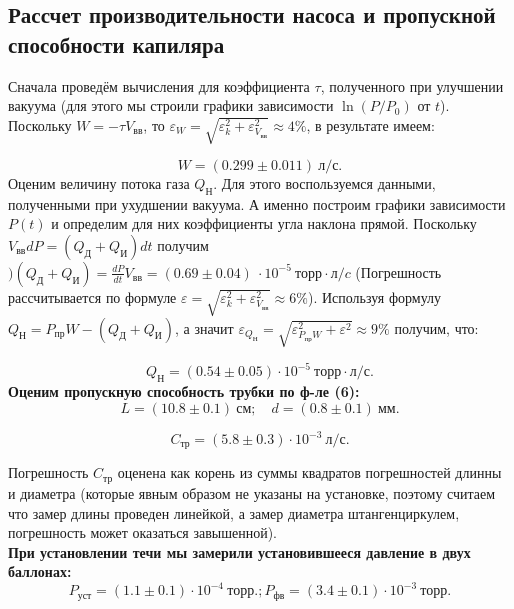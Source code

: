 \documentclass[a4paper, 12pt]{article}%
\begin{document}
\subsection{Рассчет производительности насоса и пропускной способности капиляра}
Сначала проведём вычисления для коэффициента $\tau$, полученного при улучшении вакуума (для этого мы строили графики зависимости $\ln (P/P_0)$ от $t$). Поскольку $W = -\tau V_{вв}$, то $\varepsilon_W = \sqrt{\varepsilon_k^2 + \varepsilon_{V_{вв}}^2} \approx 4\%$, в результате имеем: 

\begin{equation*}
W = (0.299 \pm 0.011) ~ л /	 с.
\end{equation*}
Оценим величину потока газа  $Q_Н$. Для этого воспользуемся данными, полученными при ухудшении вакуума. А именно построим графики зависимости $P(t)$ и определим для них коэффициенты угла наклона прямой. Поскольку $V_{вв}dP = (Q_Д + Q_И) dt$ получим $)(Q_Д + Q_И) = \frac{dP}{dt}V_{вв} = (0.69 \pm 0.04)~ \cdot 10^{-5} ~торр \cdot л / c $ (Погрешность рассчитывается по формуле $\varepsilon =  \sqrt{\varepsilon_k^2 + \varepsilon_{V_{вв}}^2} \approx 6\%$). Используя формулу $Q_Н = P_{пр}W - (Q_Д + Q_И)$, а значит $\varepsilon_{Q_Н} =  \sqrt{\varepsilon_{P_{пр}W}^2 + \varepsilon^2} \approx 9\%$ получим, что: 

\begin{equation*}
	Q_Н = (0.54 \pm 0.05) \cdot 10^{-5} ~ торр \cdot л / с.
\end{equation*}
\textbf{Оценим пропускную способность трубки по ф-ле (6):}
\begin{equation*}
	L = (10.8 \pm 0.1)~ см; \quad   d = (0.8 \pm 0.1) ~ мм.
\end{equation*}

\begin{equation*}
	C_{тр} = (5.8 \pm 0.3)\cdot 10^{-3}~ л / с.
\end{equation*}


Погрешность $C_{тр}$  оценена как корень из суммы квадратов погрешностей длинны и диаметра (которые явным образом не указаны на установке, поэтому считаем что замер длины проведен линейкой, а замер диаметра штангенциркулем, погрешность может оказаться завышенной). \\
\textbf{При установлении течи мы замерили установившееся давление в двух баллонах:}
\begin{equation*}
	P_{уст} = (1.1 \pm 0.1) \cdot 10^{-4} ~ торр.;	P_{фв} = (3.4 \pm 0.1) \cdot 10^{-3} ~ торр.
\end{equation*}
\end{document}
